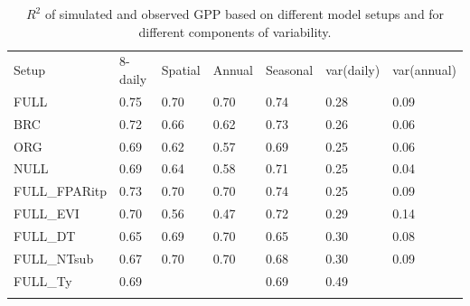 \documentclass[gmd, manuscript]{copernicus}
\begin{document}
\begin{table}
\caption{$R^2$ of simulated and observed GPP based on different model setups and for different components of variability.} 
\begin{tabular}{lllllll}
  \tophline
  Setup & 8-daily & Spatial & Annual & Seasonal & var(daily) & var(annual) \\ 
  \middlehline
  FULL & 0.75 & 0.70 & 0.70 & 0.74 & 0.28 & 0.09 \\ 
  BRC & 0.72 & 0.66 & 0.62 & 0.73 & 0.26 & 0.06 \\ 
  ORG & 0.69 & 0.62 & 0.57 & 0.69 & 0.25 & 0.06 \\ 
  NULL & 0.69 & 0.64 & 0.58 & 0.71 & 0.25 & 0.04 \\ 
  \middlehline
  FULL\_FPARitp & 0.73 & 0.70 & 0.70 & 0.74 & 0.25 & 0.09 \\ 
  FULL\_EVI & 0.70 & 0.56 & 0.47 & 0.72 & 0.29 & 0.14 \\ 
  \middlehline
  FULL\_DT & 0.65 & 0.69 & 0.70 & 0.65 & 0.30 & 0.08 \\ 
  FULL\_NTsub & 0.67 & 0.70 & 0.70 & 0.68 & 0.30 & 0.09 \\ 
  FULL\_Ty & 0.69 &  &  & 0.69 & 0.49 & \\ 
  \bottomhline
  \end{tabular}
\label{tab:rsq}
\end{table}
\end{document}
